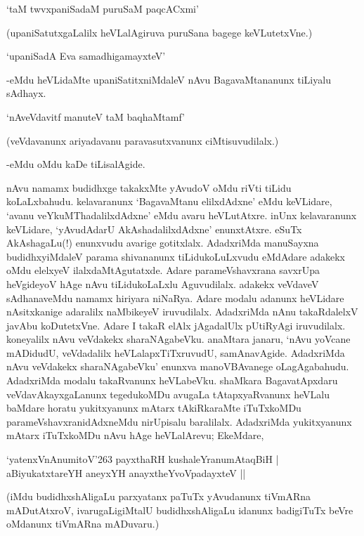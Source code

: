 \begin{shloka}
`taM twvxpaniSadaM puruSaM paqcACxmi'
\end{shloka}

(upaniSatutxgaLalilx heVLalAgiruva puruSana bagege keVLutetxVne.)

\begin{shloka}
`upaniSadA Eva samadhigamayxteV'
\end{shloka}

-eMdu heVLidaMte upaniSatitxniMdaleV nAvu BagavaMtananunx tiLiyalu sAdhayx.

\begin{shloka}
`nAveVdavitf manuteV taM baqhaMtamf'
\end{shloka}

(veVdavanunx ariyadavanu paravasutxvanunx ciMtisuvudilalx.)

-eMdu oMdu kaDe tiLisalAgide.

nAvu namamx budidhxge takakxMte yAvudoV oMdu riVti tiLidu koLaLxbahudu. kelavaranunx `BagavaMtanu elilxdAdxne' eMdu keVLidare, `avanu veYkuMThadalilxdAdxne' eMdu avaru heVLutAtxre. inUnx kelavaranunx keVLidare, `yAvudAdarU AkAshadalilxdAdxne' enunxtAtxre. eSuTx AkAshagaLu(!) enunxvudu avarige gotitxlalx. AdadxriMda manuSayxna budidhxyiMdaleV parama shivananunx tiLidukoLuLxvudu eMdAdare adakekx oMdu elelxyeV ilalxdaMtAgutatxde. Adare parameVshavxrana savxrUpa heVgideyoV hAge nAvu tiLidukoLaLxlu Aguvudilalx. adakekx veVdaveV sAdhanaveMdu namamx hiriyara niNaRya. Adare modalu adanunx heVLidare nAsitxkanige adaralilx naMbikeyeV iruvudilalx. AdadxriMda nAnu takaRdalelxV javAbu koDutetxVne. Adare I takaR elAlx jAgadalUlx pUtiRyAgi iruvudilalx. koneyalilx nAvu veVdakekx sharaNAgabeVku. anaMtara janaru, `nAvu yoVcane mADidudU, veVdadalilx heVLalapxTiTxruvudU, samAnavAgide. AdadxriMda nAvu veVdakekx sharaNAgabeVku' enunxva manoVBAvanege oLagAgabahudu. AdadxriMda modalu takaRvanunx heVLabeVku. shaMkara BagavatApxdaru veVdavAkayxgaLanunx tegedukoMDu avugaLa tAtapxyaRvanunx heVLalu baMdare horatu yukitxyanunx mAtarx tAkiRkaraMte iTuTxkoMDu parameVshavxranidAdxneMdu nirUpisalu baralilalx. AdadxriMda yukitxyanunx mAtarx iTuTxkoMDu nAvu hAge heVLalArevu; EkeMdare, 

\begin{shloka}
`yatenxVnAnumitoV\char'263 payxthaRH kushaleYranumAtaqBiH |\\
aBiyukatxtareYH aneyxYH anayxtheYvoVpadayxteV ||
\end{shloka}

(iMdu budidhxshAligaLu parxyatanx paTuTx yAvudanunx tiVmARna mADutAtxroV, ivarugaLigiMtalU budidhxshAligaLu idanunx badigiTuTx beVre oMdanunx tiVmARna mADuvaru.)

